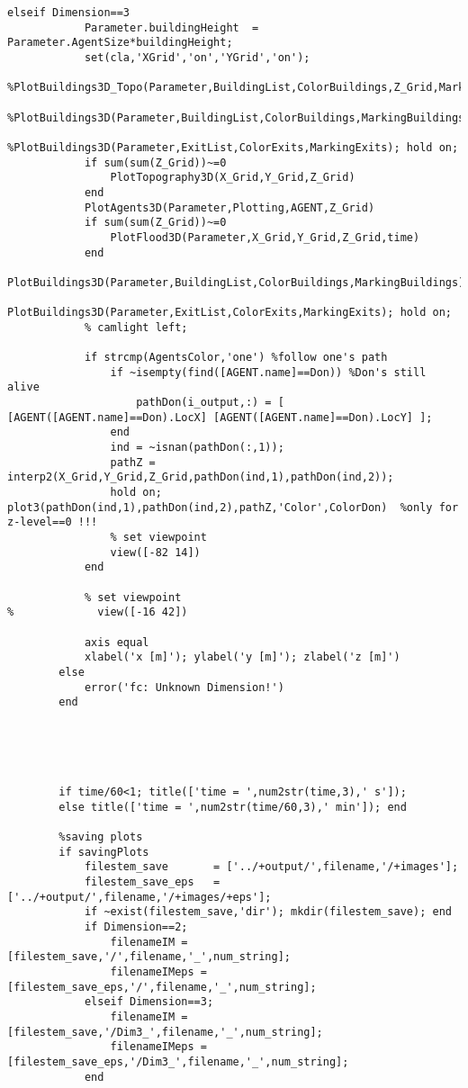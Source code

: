 \begin{lstlisting}[breaklines]
        elseif Dimension==3
            Parameter.buildingHeight  = Parameter.AgentSize*buildingHeight;
            set(cla,'XGrid','on','YGrid','on');
            %PlotBuildings3D_Topo(Parameter,BuildingList,ColorBuildings,Z_Grid,MarkingBuildings)
            %PlotBuildings3D(Parameter,BuildingList,ColorBuildings,MarkingBuildings)
            %PlotBuildings3D(Parameter,ExitList,ColorExits,MarkingExits); hold on;
            if sum(sum(Z_Grid))~=0
                PlotTopography3D(X_Grid,Y_Grid,Z_Grid)
            end
            PlotAgents3D(Parameter,Plotting,AGENT,Z_Grid)
            if sum(sum(Z_Grid))~=0
                PlotFlood3D(Parameter,X_Grid,Y_Grid,Z_Grid,time)
            end
            PlotBuildings3D(Parameter,BuildingList,ColorBuildings,MarkingBuildings)
            PlotBuildings3D(Parameter,ExitList,ColorExits,MarkingExits); hold on;
            % camlight left;
            
            if strcmp(AgentsColor,'one') %follow one's path
                if ~isempty(find([AGENT.name]==Don)) %Don's still alive
                    pathDon(i_output,:) = [ [AGENT([AGENT.name]==Don).LocX] [AGENT([AGENT.name]==Don).LocY] ];
                end
                ind = ~isnan(pathDon(:,1));
                pathZ = interp2(X_Grid,Y_Grid,Z_Grid,pathDon(ind,1),pathDon(ind,2));
                hold on; plot3(pathDon(ind,1),pathDon(ind,2),pathZ,'Color',ColorDon)  %only for z-level==0 !!!
                % set viewpoint
                view([-82 14])
            end
            
            % set viewpoint
%             view([-16 42])
            
            axis equal
            xlabel('x [m]'); ylabel('y [m]'); zlabel('z [m]')
        else
            error('fc: Unknown Dimension!')
        end
        
        
        
        
            
        if time/60<1; title(['time = ',num2str(time,3),' s']);
        else title(['time = ',num2str(time/60,3),' min']); end
        
        %saving plots
        if savingPlots
            filestem_save       = ['../+output/',filename,'/+images'];
            filestem_save_eps   = ['../+output/',filename,'/+images/+eps'];
            if ~exist(filestem_save,'dir'); mkdir(filestem_save); end
            if Dimension==2; 
                filenameIM = [filestem_save,'/',filename,'_',num_string]; 
                filenameIMeps = [filestem_save_eps,'/',filename,'_',num_string];
            elseif Dimension==3; 
                filenameIM = [filestem_save,'/Dim3_',filename,'_',num_string]; 
                filenameIMeps = [filestem_save_eps,'/Dim3_',filename,'_',num_string]; 
            end
            

\end{lstlisting}
